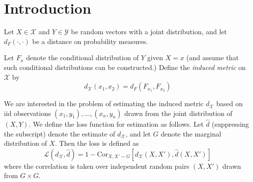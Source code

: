 \documentclass[12pt]{article}
\begin{document}
\maketitle

\newcommand{\tr}{\text{tr}}
\newcommand{\E}{\textbf{E}}
\newcommand{\diag}{\text{diag}}
\newcommand{\argmax}{\text{argmax}}
\newcommand{\Cov}{\text{Cov}}
\newcommand{\Cor}{\text{Cor}}
\newcommand{\Var}{\text{Var}}
\newcommand{\argmin}{\text{argmin}}
\newcommand{\Vol}{\text{Vol}}
\newcommand{\comm}[1]{}


\section{Introduction}

Let $X \in \mathcal{X}$ and $Y \in \mathcal{Y}$ be random vectors with
a joint distribution, and let $d_F(\cdot, \cdot)$ be a distance on
probability measures.

Let $F_x$ denote the conditional distribution of $Y$ given $X=x$ (and
assume that such conditional distributions can be constructed.)
Define the \emph{induced metric} on $\mathcal{X}$ by
\[
d_\mathcal{X}(x_1, x_2) = d_F(F_{x_1}, F_{x_2})
\]

We are interested in the problem of estimating the induced metric
$d_{\mathcal{X}}$ based on iid observations $(x_1,y_1),\hdots, (x_n,
y_n)$ drawn from the joint distribution of $(X, Y)$.  We define the
loss function for estimation as follows. Let $\hat{d}$ (suppressing
the subscript) denote the estimate of $d_{\mathcal{X}}$, and let
$G$ denote the marginal distribution of $X$. Then the loss
is defined as
\[
\mathcal{L}(d_\mathcal{X}, \hat{d}) 
= 1 - \Cor_{X, X' \sim G}[d_\mathcal{X}(X, X'), \hat{d}(X, X')]
\]
where the correlation is taken over independent random pairs $(X, X')$
drawn from $G \times G$.
\end{document}
